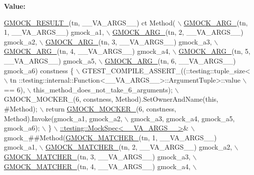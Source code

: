{\bfseries Value\+:}
\begin{DoxyCode}
\hyperlink{gmock-generated-function-mockers_8h_a0e9d94e9c77df84f1103af06feee1077}{GMOCK\_RESULT\_}(tn, \_\_VA\_ARGS\_\_) ct Method( \(\backslash\)
      \hyperlink{gmock-generated-function-mockers_8h_a887575cc1c31158fba808180a10c004f}{GMOCK\_ARG\_}(tn, 1, \_\_VA\_ARGS\_\_) gmock\_a1, \(\backslash\)
      \hyperlink{gmock-generated-function-mockers_8h_a887575cc1c31158fba808180a10c004f}{GMOCK\_ARG\_}(tn, 2, \_\_VA\_ARGS\_\_) gmock\_a2, \(\backslash\)
      \hyperlink{gmock-generated-function-mockers_8h_a887575cc1c31158fba808180a10c004f}{GMOCK\_ARG\_}(tn, 3, \_\_VA\_ARGS\_\_) gmock\_a3, \(\backslash\)
      \hyperlink{gmock-generated-function-mockers_8h_a887575cc1c31158fba808180a10c004f}{GMOCK\_ARG\_}(tn, 4, \_\_VA\_ARGS\_\_) gmock\_a4, \(\backslash\)
      \hyperlink{gmock-generated-function-mockers_8h_a887575cc1c31158fba808180a10c004f}{GMOCK\_ARG\_}(tn, 5, \_\_VA\_ARGS\_\_) gmock\_a5, \(\backslash\)
      \hyperlink{gmock-generated-function-mockers_8h_a887575cc1c31158fba808180a10c004f}{GMOCK\_ARG\_}(tn, 6, \_\_VA\_ARGS\_\_) gmock\_a6) constness \{ \(\backslash\)
    GTEST\_COMPILE\_ASSERT\_((::testing::tuple\_size<                          \(\backslash\)
        tn ::testing::internal::Function<\_\_VA\_ARGS\_\_>::ArgumentTuple>::value \(\backslash\)
            == 6), \(\backslash\)
        this\_method\_does\_not\_take\_6\_arguments); \(\backslash\)
    GMOCK\_MOCKER\_(6, constness, Method).SetOwnerAndName(\textcolor{keyword}{this}, #Method); \(\backslash\)
    return \hyperlink{gmock-generated-function-mockers_8h_a7d362499e27b1bc3a9806dd3cf58a5b7}{GMOCK\_MOCKER\_}(6, constness, Method).Invoke(gmock\_a1, gmock\_a2, \(\backslash\)
        gmock\_a3, gmock\_a4, gmock\_a5, gmock\_a6); \(\backslash\)
  \} \(\backslash\)
  \hyperlink{classtesting_1_1internal_1_1MockSpec}{::testing::MockSpec<\_\_VA\_ARGS\_\_>}& \(\backslash\)
      gmock\_##Method(\hyperlink{gmock-generated-function-mockers_8h_aa87d0009fe91f1c89d658776b55a769c}{GMOCK\_MATCHER\_}(tn, 1, \_\_VA\_ARGS\_\_) gmock\_a1, \(\backslash\)
                     \hyperlink{gmock-generated-function-mockers_8h_aa87d0009fe91f1c89d658776b55a769c}{GMOCK\_MATCHER\_}(tn, 2, \_\_VA\_ARGS\_\_) gmock\_a2, \(\backslash\)
                     \hyperlink{gmock-generated-function-mockers_8h_aa87d0009fe91f1c89d658776b55a769c}{GMOCK\_MATCHER\_}(tn, 3, \_\_VA\_ARGS\_\_) gmock\_a3, \(\backslash\)
                     \hyperlink{gmock-generated-function-mockers_8h_aa87d0009fe91f1c89d658776b55a769c}{GMOCK\_MATCHER\_}(tn, 4, \_\_VA\_ARGS\_\_) gmock\_a4, \(\backslash\)

\end{DoxyCode}
